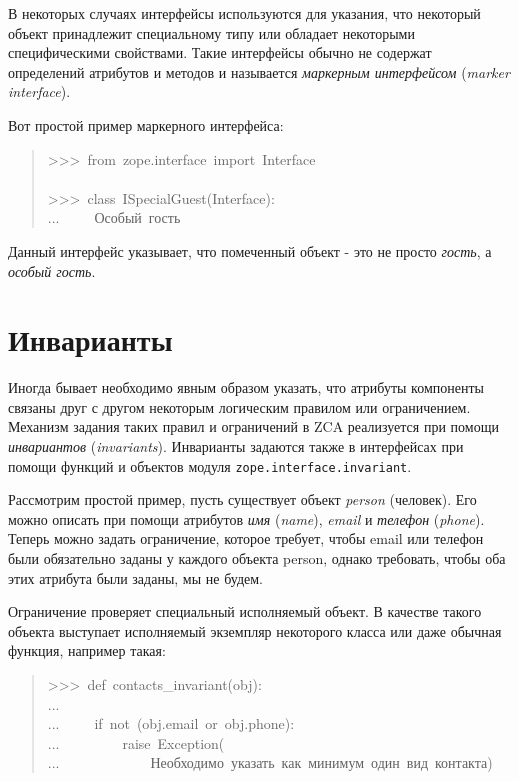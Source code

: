 \documentclass[14pt,a4paper,openany,twoside,final]{extbook}
\providecommand*{\DUroletitlereference}[1]{\textsl{#1}}
\begin{document}
В некоторых случаях интерфейсы используются для указания, что
некоторый объект принадлежит специальному типу или обладает некоторыми
специфическими свойствами.  Такие интерфейсы обычно не содержат
определений атрибутов и методов и называется \DUroletitlereference{маркерным интерфейсом}
(\DUroletitlereference{marker interface}).

Вот простой пример маркерного интерфейса:

\begin{quote}{\ttfamily \raggedright \noindent
>{}>{}>~from~zope.interface~import~Interface\\
~\\
>{}>{}>~class~ISpecialGuest(Interface):\\
...~~~~~\textquotedbl{}\textquotedbl{}\textquotedbl{}Особый~гость\textquotedbl{}\textquotedbl{}\textquotedbl{}
}
\end{quote}

Данный интерфейс указывает, что помеченный объект - это не просто
\DUroletitlereference{гость}, а \DUroletitlereference{особый гость}.


\section{Инварианты%
  \label{id32}%
}

Иногда бывает необходимо явным образом указать, что атрибуты
компоненты связаны друг с другом некоторым логическим правилом или
ограничением.  Механизм задания таких правил и ограничений в ZCA
реализуется при помощи \DUroletitlereference{инвариантов} (\DUroletitlereference{invariants}).  Инварианты
задаются также в интерфейсах при помощи функций и объектов модуля \texttt{zope.interface.invariant}.

Рассмотрим простой пример, пусть существует объект \DUroletitlereference{person} (человек).
Его можно описать при помощи атрибутов \DUroletitlereference{имя} (\DUroletitlereference{name}), \DUroletitlereference{email} и
\DUroletitlereference{телефон} (\DUroletitlereference{phone}).  Теперь можно задать ограничение, которое
требует, чтобы email или телефон были обязательно заданы у каждого
объекта person, однако требовать, чтобы оба этих атрибута были заданы,
мы не будем.

Ограничение проверяет специальный исполняемый объект.  В качестве
такого объекта выступает исполняемый экземпляр некоторого класса или
даже обычная функция, например такая:

\begin{quote}{\ttfamily \raggedright \noindent
>{}>{}>~def~contacts\_invariant(obj):\\
...\\
...~~~~~if~not~(obj.email~or~obj.phone):\\
...~~~~~~~~~raise~Exception(\\
...~~~~~~~~~~~~~\textquotedbl{}Необходимо~указать~как~минимум~один~вид~контакта\textquotedbl{})
}
\end{quote}
\end{document}
